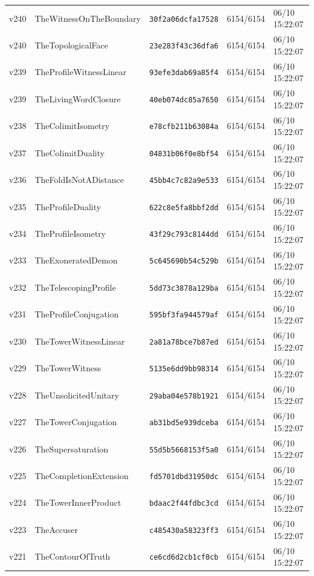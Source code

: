 \documentclass[11pt]{article}
\theoremstyle{definition}\newtheorem{deriv}{Derivação}
\begin{document}
{\begin{longtable}{@{}lllll@{}}
v240 & TheWitnessOnTheBoundary & \texttt{30f2a06dcfa17528} & 6154/6154 & 06/10 15:22:07 \\
v240 & TheTopologicalFace & \texttt{23e283f43c36dfa6} & 6154/6154 & 06/10 15:22:07 \\
v239 & TheProfileWitnessLinear & \texttt{93efe3dab69a85f4} & 6154/6154 & 06/10 15:22:07 \\
v239 & TheLivingWordClosure & \texttt{40eb074dc85a7650} & 6154/6154 & 06/10 15:22:07 \\
v238 & TheColimitIsometry & \texttt{e78cfb211b63084a} & 6154/6154 & 06/10 15:22:07 \\
v237 & TheColimitDuality & \texttt{04831b06f0e8bf54} & 6154/6154 & 06/10 15:22:07 \\
v236 & TheFoldIsNotADistance & \texttt{45bb4c7c82a9e533} & 6154/6154 & 06/10 15:22:07 \\
v235 & TheProfileDuality & \texttt{622c8e5fa8bbf2dd} & 6154/6154 & 06/10 15:22:07 \\
v234 & TheProfileIsometry & \texttt{43f29c793c8144dd} & 6154/6154 & 06/10 15:22:07 \\
v233 & TheExoneratedDemon & \texttt{5c645690b54c529b} & 6154/6154 & 06/10 15:22:07 \\
v232 & TheTelescopingProfile & \texttt{5dd73c3878a129ba} & 6154/6154 & 06/10 15:22:07 \\
v231 & TheProfileConjugation & \texttt{595bf3fa944579af} & 6154/6154 & 06/10 15:22:07 \\
v230 & TheTowerWitnessLinear & \texttt{2a81a78bce7b87ed} & 6154/6154 & 06/10 15:22:07 \\
v229 & TheTowerWitness & \texttt{5135e6dd9bb98314} & 6154/6154 & 06/10 15:22:07 \\
v228 & TheUnsolicitedUnitary & \texttt{29aba04e578b1921} & 6154/6154 & 06/10 15:22:07 \\
v227 & TheTowerConjugation & \texttt{ab31bd5e939dceba} & 6154/6154 & 06/10 15:22:07 \\
v226 & TheSupersaturation & \texttt{55d5b5668153f5a0} & 6154/6154 & 06/10 15:22:07 \\
v225 & TheCompletionExtension & \texttt{fd5701dbd31950dc} & 6154/6154 & 06/10 15:22:07 \\
v224 & TheTowerInnerProduct & \texttt{bdaac2f44fdbc3cd} & 6154/6154 & 06/10 15:22:07 \\
v223 & TheAccuser & \texttt{c485430a58323ff3} & 6154/6154 & 06/10 15:22:07 \\
v221 & TheContourOfTruth & \texttt{ce6cd6d2cb1cf0cb} & 6154/6154 & 06/10 15:22:07 \\

\end{longtable}}
\end{document}
